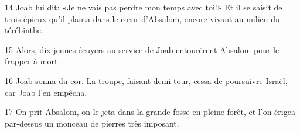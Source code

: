 
14 Joab lui dit: «Je ne vais pas perdre mon temps avec toi!» Et il se saisit de trois épieux qu’il planta dans le cœur d’Absalom, encore vivant au milieu du térébinthe.

15 Alors, dix jeunes écuyers au service de Joab entourèrent Absalom pour le frapper à mort.

16 Joab sonna du cor. La troupe, faisant demi-tour, cessa de poursuivre Israël, car Joab l’en empêcha.

17 On prit Absalom, on le jeta dans la grande fosse en pleine forêt, et l’on érigea par-dessus un monceau de pierres très imposant.